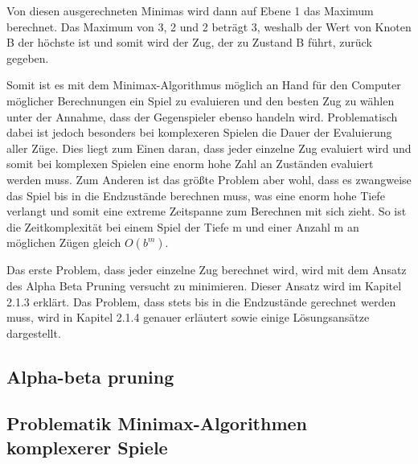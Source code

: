Von diesen ausgerechneten Minimas wird dann auf Ebene 1 das Maximum berechnet. Das Maximum von 3, 2 und 2 beträgt 3, weshalb der Wert von Knoten B der höchste ist und somit wird der Zug, der zu Zustand B führt, zurück gegeben.

Somit ist es mit dem Minimax-Algorithmus möglich an Hand für den Computer möglicher Berechnungen ein Spiel zu evaluieren und den besten Zug zu wählen unter der Annahme, dass der Gegenspieler ebenso handeln wird. Problematisch dabei ist jedoch besonders bei komplexeren Spielen die Dauer der Evaluierung aller Züge. Dies liegt zum Einen daran, dass jeder einzelne Zug evaluiert wird und somit bei komplexen Spielen eine enorm hohe Zahl an Zuständen evaluiert werden muss. Zum Anderen ist das größte Problem aber wohl, dass es zwangweise das Spiel bis in die Endzustände berechnen muss, was eine enorm hohe Tiefe verlangt und somit eine extreme Zeitspanne zum Berechnen mit sich zieht. So ist die Zeitkomplexität bei einem Spiel der Tiefe m und einer Anzahl m an möglichen Zügen gleich $O(b^m)$.



Das erste Problem, dass jeder einzelne Zug berechnet wird, wird mit dem Ansatz des Alpha Beta Pruning versucht zu minimieren. Dieser Ansatz wird im Kapitel 2.1.3 erklärt. Das Problem, dass stets bis in die Endzustände gerechnet werden muss, wird in Kapitel 2.1.4 genauer erläutert sowie einige Lösungsansätze dargestellt.




\subsection{Alpha-beta pruning}



\subsection{Problematik Minimax-Algorithmen komplexerer Spiele}



   
